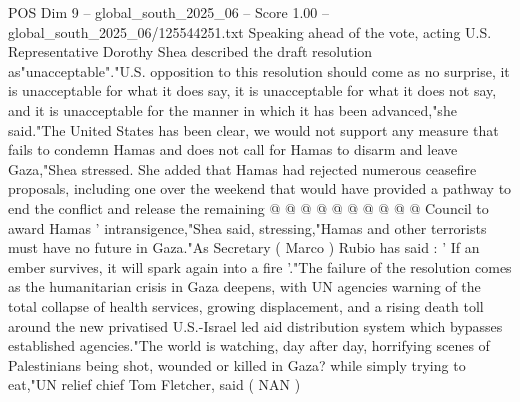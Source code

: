 \begin{textsample}{POS Dim 9 – global\_south\_2025\_06 – Score 1.00 – global\_south\_2025\_06/125544251.txt}
Speaking ahead of the vote, acting U.S.
Representative Dorothy Shea described the draft resolution as"unacceptable"."U.S. opposition to this resolution should come as no surprise, it is unacceptable for what it does say, it is unacceptable for what it does not say, and it is unacceptable for the manner in which it has been advanced,"she said."The United States has been clear, we would not support any measure that fails to condemn Hamas and does not call for Hamas to disarm and leave Gaza,"Shea stressed.
She added that Hamas had rejected numerous ceasefire proposals, including one over the weekend that would have provided a pathway to end the conflict and release the remaining @ @ @ @ @ @ @ @ @ @ Council to award Hamas ' intransigence,"Shea said, stressing,"Hamas and other terrorists must have no future in Gaza."As Secretary ( Marco ) Rubio has said : ' If an ember survives, it will spark again into a fire '."The failure of the resolution comes as the humanitarian crisis in Gaza deepens, with UN agencies warning of the total collapse of health services, growing displacement, and a rising death toll around the new privatised U.S.-Israel led aid distribution system which bypasses established agencies."The world is watching, day after day, horrifying scenes of Palestinians being shot, wounded or killed in Gaza? while simply trying to eat,"UN relief chief Tom Fletcher, said ( NAN )

\end{textsample}
